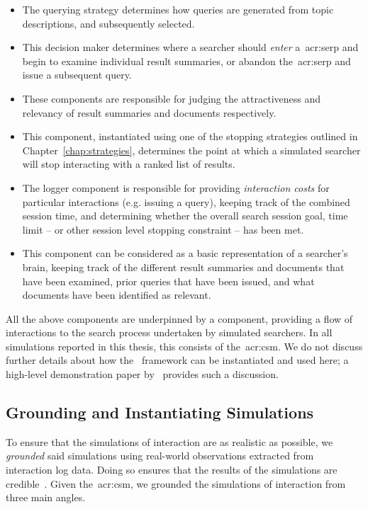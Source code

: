 \begin{itemize}
    \item{ The querying strategy determines how queries are generated from topic descriptions, and subsequently selected.}
    \item{ This decision maker determines where a searcher should \emph{enter} a~\gls{acr:serp} and begin to examine individual result summaries, or abandon the~\gls{acr:serp} and issue a subsequent query.}
    \item{ These components are responsible for judging the attractiveness and relevancy of result summaries and documents respectively.}
    \item{ This component, instantiated using one of the stopping strategies outlined in Chapter~\ref{chap:strategies}, determines the point at which a simulated searcher will stop interacting with a ranked list of results.}
    \item{ The logger component is responsible for providing \emph{interaction costs} for particular interactions (e.g. issuing a query), keeping track of the combined session time, and determining whether the overall search session goal, time limit -- or other session level stopping constraint -- has been met.}
    \item{ This component can be considered as a basic representation of a searcher's brain, keeping track of the different result summaries and documents that have been examined, prior queries that have been issued, and what documents have been identified as relevant.}
\end{itemize}

All the above components are underpinned by a  component, providing a flow of interactions to the search process undertaken by simulated searchers. In all simulations reported in this thesis, this consists of the~\gls{acr:csm}. We do not discuss further details about how the \simiir~framework can be instantiated and used here; a high-level demonstration paper by~\cite{maxwell2016simiir} provides such a discussion.

\subsection{Grounding and Instantiating Simulations}\label{sec:method:simulation:grounding}
To ensure that the simulations of interaction are as realistic as possible, we \emph{grounded} said simulations using real-world observations extracted from interaction log data. Doing so ensures that the results of the simulations are credible~\citep{azzopardi2010workshop}. Given the~\gls{acr:csm}, we grounded the simulations of interaction from three main angles.


